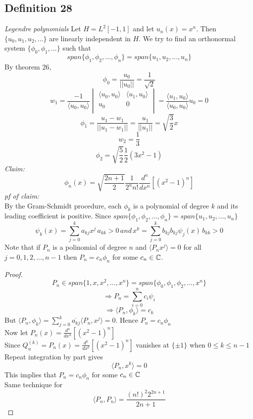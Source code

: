 \documentclass{article}
\begin{document}
\subsection*{Definition 28}
\emph{Legendre polynomials}
Let $H=L^2[-1,1]$ and let $u_n(x)=x^n$. Then $\{u_0, u_1, u_2,...\}$ are linearly independent in $H$. We try to find an orthonormal system $\{ \phi_0, \phi_1, ...\}$ such that 
\[
span\{\phi_1, \phi_2, ...,\phi_n\}=span\{u_1, u_2, ...,u_n\}
\]
By theorem 26, 
\[
\phi_0=\frac{u_0}{||u_0||}=\frac{1}{\sqrt{2}}
\]
\[
w_1=\frac{-1}{\langle u_0,u_0 \rangle}
\begin{vmatrix}
\langle u_0, u_0 \rangle & \langle u_1, u_0 \rangle \\
u_0 & 0\\
\end{vmatrix}
=\frac{\langle u_1, u_0 \rangle}{\langle u_0, u_0 \rangle} u_0=0
\]
\[
\phi_1=\frac{u_1-w_1}{||u_1-w_1||}=\frac{u_1}{||u_1||}=\sqrt{\frac{3}{2}}x
\]
\[
w_2=\frac{1}{3}
\]
\[
\phi_2=\sqrt{\frac{5}{2}}\frac{1}{2}(3x^2-1)
\]
\emph{Claim:}
\[
\phi_n(x)=\sqrt{\frac{2n+1}{2}}\frac{1}{2^n n!}\frac{d^n}{dx^n}[(x^2-1)^n]
\]
\emph{pf of claim:}\\
By the Gram-Schmidt procedure, each $\phi_k$ is a polynomial of degree $k$ and its leading coefficient is positive. Since $span\{\phi_1, \phi_2, ...,\phi_n\}=span\{u_1, u_2, ...,u_n\}$
\[
\psi_k(x)=\sum_{j=0}^{k}a_{kj}x^j\, a_{kk}>0\, and\, x^k=\sum_{j=0}^{k}b_{kj}b_{kj}\psi_{j}(x)\, b_{kk}>0
\]
Note that if $P_n$ is a polinomial of degree $n$ and $\langle P_n x^j \rangle=0$ for all $j=0,1,2,...,n-1$ then $P_n=c_n\phi_n$ for some $c_n\in \Bbb{C}$.
\begin{proof}
\[
P_n \in span\{1,x,x^2,...,x^n\}=span\{\phi_0,\phi_1,\phi_2,...,x^n\}
\]
\[
\Rightarrow P_n=\sum_{i=0}^{n}c_i\psi_i
\]
\[
\Rightarrow \langle P_n, \phi_k \rangle = c_k 
\]
But $\langle P_n,\phi_k \rangle=\sum_{j=0}^{k}\overline{a_{kj}}\langle P_n, x^j \rangle=0$. Hence $P_n=c_n\phi_n$\\
Now let $P_n(x)=\frac{d^n}{dx^n}[(x^2-1)^n]$\\
Since $Q_n^{(k)}=P_n(x)=\frac{d^k}{dx^k}[(x^2-1)^n]$ vanishes at $\{ \pm 1\}$ when $0\leq k \leq n-1$\\
Repeat integration by part gives 
\[
\langle P_n, x^k \rangle=0
\]
This implies that $P_n=c_n\phi_n$ for some $c_n\in \Bbb{C}$\\
Same technique for 
\[
\langle P_n,P_n \rangle=\frac{(n!)^2 2^{2n+1}}{2n+1}
\]
\end{proof}
\end{document}
